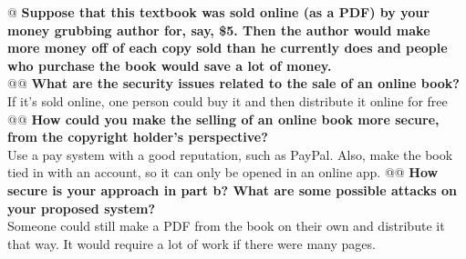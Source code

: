 \documentclass{article}
\begin{document}
\begin{easylist}
 	@ \textbf{Suppose that this textbook was sold online (as a PDF) by your money grubbing author for, say, \$5. Then the author would make more money off of each copy sold than he currently does and people who purchase the book would save a lot of money.}\\
 	@@ \textbf{What are the security issues related to the sale of an online book?}\\
 		If it's sold online, one person could buy it and then distribute it online for free
 	@@ \textbf{How could you make the selling of an online book more secure, from the copyright holder's perspective?}\\
 		Use a pay system with a good reputation, such as PayPal. Also, make the book tied in with an account, so it can only be opened in an online app.
 	@@ \textbf{How secure is your approach in part b? What are some possible attacks on your proposed system?}\\
 		Someone could still make a PDF from the book on their own and distribute it that way. It would require a lot of work if there were many pages.
 
\end{easylist}
\end{document}
